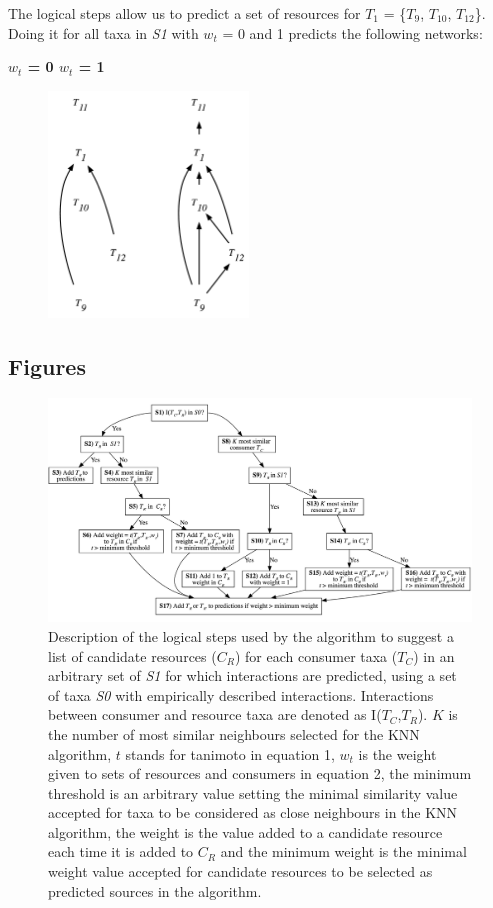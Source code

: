 \documentclass[letterpaper]{article}
\begin{document}
The logical steps allow us to predict a set of resources for $T_1$ = \{$T_9$, $T_{10}$, $T_{12}$\}. Doing it for all taxa in \textit{S1} with $w_t$ = 0 and 1 predicts the following networks:
\bigskip

\centerline{\textbf{$w_t$ = 0 \quad \quad \quad \quad \quad $w_t$ = 1} \quad}
    \begin{figure}[h!]
    \centering\includegraphics[height = 6cm]{example.png}
    \end{figure}

\newpage
\subsection{Figures}
    \begin{figure}[h]
      \centering\includegraphics[width=\textwidth]{Decision_Diagram.png}
      \caption{Description of the logical steps used by the algorithm to suggest a list of candidate resources ($C_R$) for each consumer taxa ($T_C$) in an arbitrary set of \textit{S1} for which interactions are predicted, using a set of taxa \textit{S0} with empirically described interactions. Interactions between consumer and resource taxa are denoted as I($T_C$,$T_R$). $K$ is the number of most similar neighbours selected for the KNN algorithm, $t$ stands for tanimoto in equation 1, $w_t$ is the weight given to sets of resources and consumers in equation 2, the minimum threshold is an arbitrary value setting the minimal similarity value accepted for taxa to be considered as close neighbours in the KNN algorithm, the weight is the value added to a candidate resource each time it is added to $C_R$ and the minimum weight is the minimal weight value accepted for candidate resources to be selected as predicted sources in the algorithm.}
      \label{fig:decision_diag}
    \end{figure}
\end{document}
